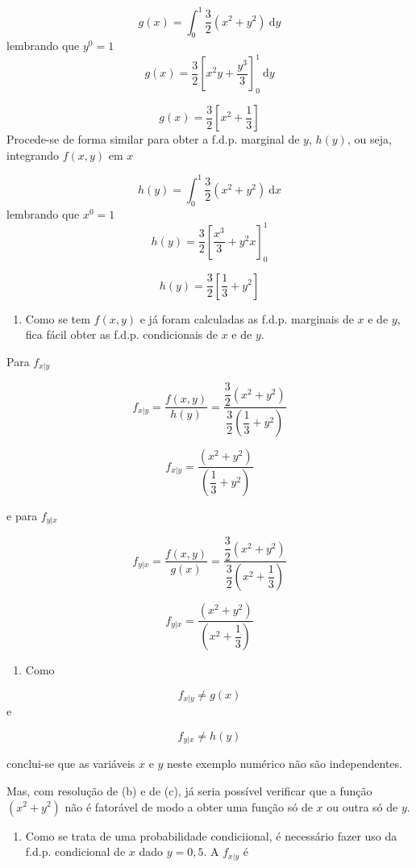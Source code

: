 \documentclass[
]{book}
\providecommand{\tightlist}{%
  \setlength{\itemsep}{0pt}\setlength{\parskip}{0pt}}
\begin{document}
\[
  g(x) = \int_{0}^{1}\dfrac{3}{2}(x^2 + y^2)~\text{d}y
\]
lembrando que \(y^0=1\)
\[
  g(x) = \dfrac{3}{2}\left[ x^2y + \dfrac{y^3}{3} \right]_{0}^{1}~\text{d}y
\]

\[
  g(x) = \dfrac{3}{2}\left[ x^2 + \dfrac{1}{3} \right]
\]
Procede-se de forma similar para obter a f.d.p. marginal de \(y\), \(h(y)\), ou seja, integrando \(f(x,y)\) em \(x\)

\[
  h(y) = \int_{0}^{1}\dfrac{3}{2}(x^2 + y^2)~\text{d}x
\]
lembrando que \(x^0 = 1\)
\[
  h(y) = \dfrac{3}{2}\left[ \dfrac{x^3}{3}+ y^2x \right]_{0}^{1}
\]

\[
  h(y) = \dfrac{3}{2}\left[ \dfrac{1}{3}+ y^2 \right]
\]

\begin{enumerate}
\def\labelenumi{\alph{enumi})}
\setcounter{enumi}{2}
\tightlist
\item
  Como se tem \(f(x,y)\) e já foram calculadas as f.d.p. marginais de \(x\) e de \(y\), fica fácil obter as f.d.p. condicionais de \(x\) e de \(y\).
\end{enumerate}

Para \(f_{x|y}\)

\[
  f_{x|y} = \dfrac{f(x,y)}{h(y)} = \dfrac{\dfrac{3}{2}(x^2 + y^2)}{\dfrac{3}{2}\left( \dfrac{1}{3} + y^2 \right)}
\]

\[
  f_{x|y} = \dfrac{(x^2 + y^2)}{\left( \dfrac{1}{3} + y^2 \right)}
\]

e para \(f_{y|x}\)

\[
  f_{y|x} = \dfrac{f(x,y)}{g(x)} = \dfrac{\dfrac{3}{2}(x^2 + y^2)}{\dfrac{3}{2}\left(x^2 + \dfrac{1}{3} \right)}
\]

\[
  f_{y|x} = \dfrac{(x^2 + y^2)}{\left(x^2 + \dfrac{1}{3} \right)}
\]

\begin{enumerate}
\def\labelenumi{\alph{enumi})}
\setcounter{enumi}{3}
\tightlist
\item
  Como
\end{enumerate}

\[
  f_{x|y} \neq g(x)
\]
e

\[
  f_{y|x} \neq h(y)
\]

conclui-se que as variáveis \(x\) e \(y\) neste exemplo numérico não são independentes.

Mas, com resolução de (b) e de (c), já seria possível verificar que a função \((x^2 + y^2)\) não é fatorável de modo a obter uma função só de \(x\) ou outra só de \(y\).

\begin{enumerate}
\def\labelenumi{\alph{enumi})}
\setcounter{enumi}{4}
\tightlist
\item
  Como se trata de uma probabilidade condiciional, é necessário fazer uso da f.d.p. condicional de \(x\) dado \(y=0,5\). A \(f_{x|y}\) é
\end{enumerate}
\end{document}
